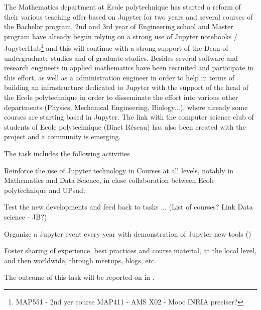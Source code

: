 \begin{task}[
  title=Teaching with Jupyter technology,
  id=teaching,
  lead=EP,
  PM=8, %
  wphases={0-48},
  partners={EP,UPSUD}
  ]
  The Mathematics department at Ecole polytechnique has started a reform of their various teaching offer based on
  Jupyter for two years and several courses of the Bachelor program, 2nd and 3rd
  year of Engineering school and Master program have already begun relying on a
  strong use of Jupyter notebooks / JupyterHub\footnote{MAP551 - 2nd yer course
  MAP411 - AMS X02 - Mooc INRIA preciser?} and this will continue with a strong
  support of the Dean of undergraduate studies and of graduate studies. Besides
  several software and research engineers in applied mathematics have been
  recruited and participate in this effort, as well as a administration engineer
  in order to help in terms of building an infrastructure dedicated to Jupyter
  with the support of the head of the Ecole polytechnique in order to disseminate
  the effort into various other departments (Physics, Mechanical Engineering,
  Biology...), where already some courses are starting based in Jupyter. The
  link with the computer science club of students of Ecole polytechnique (Binet
  R\'eseau) has also been created with the project and a community is emerging.

  The task includes the following activities
  \begin{compactitem}
  \item Reinforce the use of Jupyter technology in Courses at
    all levels, notably in Mathematics and Data Science, in close
    collaboration between Ecole polytechnique and UPsud;
  \item Test the new developments and feed back to tasks ... (List of courses? Link Data science - JB?)
  \item Organize a Jupyter event every year with demonstration of Jupyter new tools
    ()
  \item Foster sharing of experience, best practices and course
    material, at the local level, and then worldwide, through meetups,
    blogs, etc.
  \end{compactitem}
  The outcome of this task will be reported on in .
\end{task}

